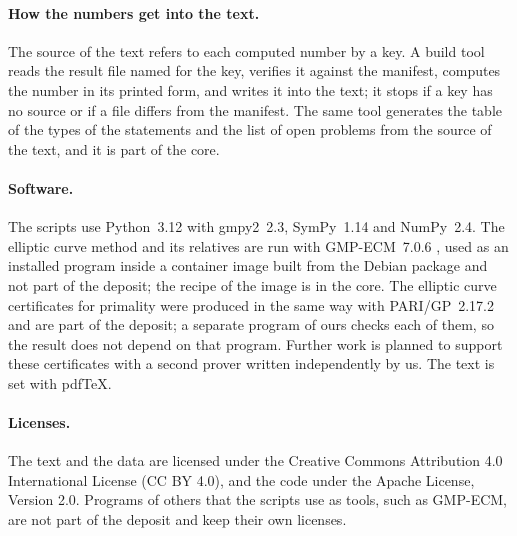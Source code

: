 \paragraph{How the numbers get into the text.} The source of the text refers to each computed number by a key. A build tool reads the result
file named for the key, verifies it against the manifest, computes the number in its printed form, and writes it into the text; it stops if a key
has no source or if a file differs from the manifest. The same tool generates the table of the types of the statements and the list of open
problems from the source of the text, and it is part of the core.

\paragraph{Software.} The scripts use Python~3.12 with gmpy2~2.3, SymPy~1.14 and NumPy~2.4. The elliptic curve method and its relatives are run
with GMP-ECM~7.0.6 \cite{GMPECM706}, used as an installed program inside a container image built from the Debian package and not part of the
deposit; the recipe of the image is in the core. The elliptic curve certificates for primality were produced in the same way with
PARI/GP~2.17.2 \cite{PARI2172} and are part of the deposit; a separate program of ours checks each of them, so the result does not
depend on that program. Further work is planned to support these certificates with a second prover written independently by us. The
text is set with pdf\TeX.

\paragraph{Licenses.} The text and the data are licensed under the Creative Commons Attribution 4.0 International License (CC BY 4.0), and
the code under the Apache License, Version 2.0. Programs of others that the scripts use as tools, such as GMP-ECM, are not part of the
deposit and keep their own licenses.
